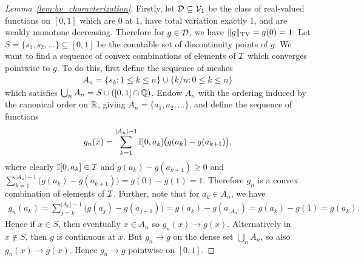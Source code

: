\begin{proof}[Lemma~\ref{lem:bv_characterization}]

  Firstly, let $\mathcal{D} \subseteq \mathcal{V}_1$
  be the class of real-valued functions
  on $[0,1]$
  which are
  0 at 1,
  have total variation exactly 1,
  and are weakly monotone decreasing.
  Therefore for $g \in \mathcal{D}$,
  we have
  $\|g\|_{\mathrm{TV}} = g(0) = 1$.
  Let $S = \{s_1, s_2, \dots\} \subseteq [0,1]$
  be the countable set of discontinuity points of $g$.
  We want to find a sequence of
  convex combinations of elements of
  $\mathcal{I}$ which converges pointwise to $g$.
  To do this, first define the sequence of meshes
  \begin{align*}
    A_n =
    \{s_k : 1 \leq k \leq n\}
    \cup
    \{k/n : 0 \leq k \leq n\}
  \end{align*}
  which satisfies
  $\bigcup_n A_n = S \cup ([0,1] \cap \mathbb{Q})$.
  Endow $A_n$ with the ordering
  induced by the canonical order on $\mathbb{R}$,
  giving $A_n = \{a_1, a_2, \ldots\}$,
  and define the sequence of functions
  \begin{align*}
    g_n(x)
    = \sum_{k = 1}^{|A_n|-1}
    \mathbb{I}[0,a_k]
    \big( g(a_k) - g(a_{k+1}) \big),
  \end{align*}
  where clearly
  $\mathbb{I}[0, a_k] \in \mathcal{I}$
  and
  $g(a_k) - g(a_{k+1}) \geq 0$
  and
  $\sum_{k = 1}^{|A_n|-1}
  \big(
  g(a_k) - g(a_{k+1})
  \big)
  = g(0) - g(1) = 1$.
  Therefore
  $g_n$ is a convex combination of elements of
  $\mathcal{I}$.
  Further, note that for
  $a_k \in A_n$,
  we have
  \begin{align*}
    g_n(a_k)
    = \sum_{j = k}^{|A_n|-1}
    \big( g(a_j) - g(a_{j+1}) \big)
    = g(a_k) - g(a_{|A_n|})
    = g(a_k) - g(1)
    = g(a_k).
  \end{align*}
  Hence if $x \in S$,
  then eventually $x \in A_n$
  so $g_n(x) \to g(x)$.
  Alternatively in $x \not\in S$,
  then $g$ is continuous at $x$.
  But $g_n \to g$ on the dense set $\bigcup_n A_n$,
  so also $g_n(x) \to g(x)$.
  Hence $g_n \to g$
  pointwise on $[0,1]$.


\end{proof}
